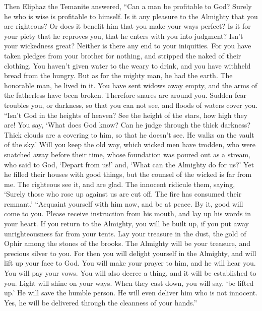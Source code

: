  Then Eliphaz the Temanite answered,  ``Can a
man be profitable to God? Surely he who is wise is profitable to
himself.  Is it any pleasure to the Almighty that you are
righteous? Or does it benefit him that you make your ways perfect?
 Is it for your piety that he reproves you, that he enters
with you into judgment?  Isn't your wickedness great?
Neither is there any end to your iniquities.  For you have
taken pledges from your brother for nothing, and stripped the naked of
their clothing.  You haven't given water to the weary to
drink, and you have withheld bread from the hungry.  But as
for the mighty man, he had the earth. The honorable man, he lived in it.
 You have sent widows away empty, and the arms of the
fatherless have been broken.  Therefore snares are around
you. Sudden fear troubles you,  or darkness, so that you
can not see, and floods of waters cover you.  ``Isn't God
in the heights of heaven? See the height of the stars, how high they
are!  You say, `What does God know? Can he judge through
the thick darkness?  Thick clouds are a covering to him, so
that he doesn't see. He walks on the vault of the sky.' 
Will you keep the old way, which wicked men have trodden, 
who were snatched away before their time, whose foundation was poured
out as a stream,  who said to God, `Depart from us!' and,
`What can the Almighty do for us?'  Yet he filled their
houses with good things, but the counsel of the wicked is far from me.
 The righteous see it, and are glad. The innocent ridicule
them,  saying, `Surely those who rose up against us are cut
off. The fire has consumed their remnant.'  ``Acquaint
yourself with him now, and be at peace. By it, good will come to you.
 Please receive instruction from his mouth, and lay up his
words in your heart.  If you return to the Almighty, you
will be built up, if you put away unrighteousness far from your tents.
 Lay your treasure in the dust, the gold of Ophir among the
stones of the brooks.  The Almighty will be your treasure,
and precious silver to you.  For then you will delight
yourself in the Almighty, and will lift up your face to God.
 You will make your prayer to him, and he will hear you.
You will pay your vows.  You will also decree a thing, and
it will be established to you. Light will shine on your ways.
 When they cast down, you will say, `be lifted up.' He will
save the humble person.  He will even deliver him who is
not innocent. Yes, he will be delivered through the cleanness of your
hands.''


